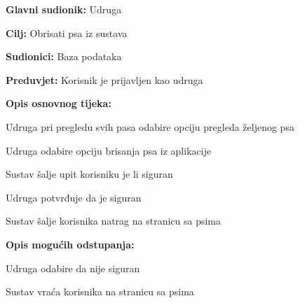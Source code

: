 					
					\noindent {}
					\begin{packed_item}
	
						\item \textbf{Glavni sudionik:} Udruga
						\item  \textbf{Cilj:} Obrisati psa iz sustava
						\item  \textbf{Sudionici:} Baza podataka
						\item  \textbf{Preduvjet:} Korisnik je prijavljen kao udruga
						\item  \textbf{Opis osnovnog tijeka:}
						
						\item[] \begin{packed_enum}
							\item Udruga pri pregledu svih pasa odabire opciju pregleda željenog psa
							\item Udruga odabire opciju brisanja psa iz aplikacije
							\item Sustav šalje upit korisniku je li siguran
							\item Udruga potvrđuje da je siguran
							\item Sustav šalje korisnika natrag na stranicu sa psima
							
						\end{packed_enum}
						
						\item  \textbf{Opis mogućih odstupanja:}
						
						\item[] \begin{packed_item}
							\item[4.a] Udruga odabire da nije siguran
							\item[] \begin{packed_enum}
								\item Sustav vraća korisnika na stranicu sa psima
							\end{packed_enum}
	
						\end{packed_item}
					\end{packed_item}
					
